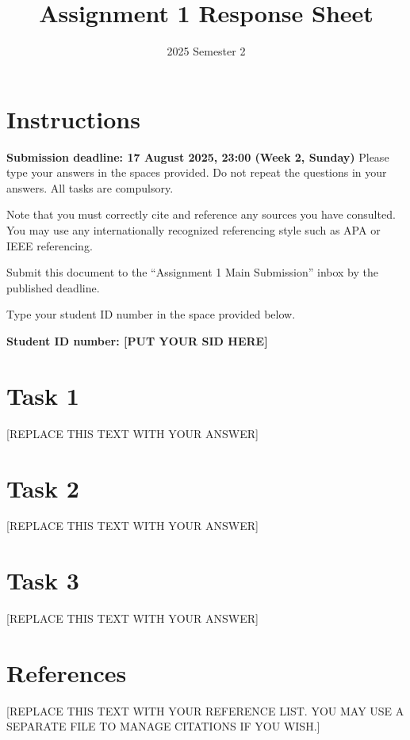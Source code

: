 \documentclass{article}
\title{Assignment 1 Response Sheet}
\date{2025 Semester 2}
\begin{document}
\maketitle

\section{Instructions}
\textbf{Submission deadline: 17 August 2025, 23:00 (Week 2, Sunday)}
Please type your answers in the spaces provided. Do not repeat the questions in your answers. All tasks are compulsory.

Note that you must correctly cite and reference any sources you have consulted. You may use any internationally recognized referencing style such as APA or IEEE referencing.

Submit this document to the ``Assignment 1 Main Submission'' inbox by the published deadline.

Type your student ID number in the space provided below.

\textbf{Student ID number: [PUT YOUR SID HERE]}

\section{Task 1}
[REPLACE THIS TEXT WITH YOUR ANSWER]

\section{Task 2}
[REPLACE THIS TEXT WITH YOUR ANSWER]

\section{Task 3}
[REPLACE THIS TEXT WITH YOUR ANSWER]


\newpage
\section{References}
[REPLACE THIS TEXT WITH YOUR REFERENCE LIST. YOU MAY USE A SEPARATE FILE TO MANAGE CITATIONS IF YOU WISH.]
\end{document}

